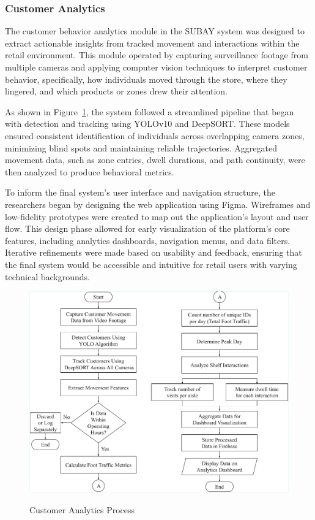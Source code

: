 {\subsubsection{Customer Analytics}

The customer behavior analytics module in the SUBAY system was designed to extract actionable insights from tracked movement and interactions within the retail environment. This module operated by capturing surveillance footage from multiple cameras and applying computer vision techniques to interpret customer behavior, specifically, how individuals moved through the store, where they lingered, and which products or zones drew their attention.

As shown in Figure~\ref{fig:3.23}, the system followed a streamlined pipeline that began with detection and tracking using YOLOv10 and DeepSORT. These models ensured consistent identification of individuals across overlapping camera zones, minimizing blind spots and maintaining reliable trajectories. Aggregated movement data, such as zone entries, dwell durations, and path continuity, were then analyzed to produce behavioral metrics.

To inform the final system's user interface and navigation structure, the researchers began by designing the web application using Figma. Wireframes and low-fidelity prototypes were created to map out the application's layout and user flow. This design phase allowed for early visualization of the platform’s core features, including analytics dashboards, navigation menus, and data filters. Iterative refinements were made based on usability and feedback, ensuring that the final system would be accessible and intuitive for retail users with varying technical backgrounds.

\begin{figure}[H]
	\caption[Customer Analytics Process]{\newline \newline Customer Analytics Process}
	\centering
	\includegraphics[width=1\linewidth]{fig/3.23.pdf}
	\label{fig:3.23}
\end{figure}

}
